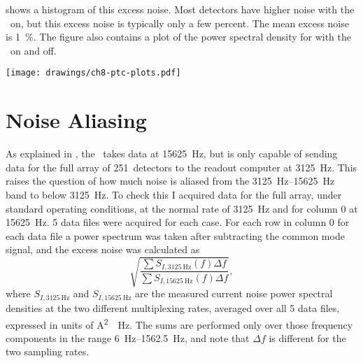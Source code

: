  shows a histogram of this excess noise. Most detectors have higher noise with the \PTC\ on, but this excess noise is typically only a few percent. 
The mean excess noise is \SI{1}{\percent}.
The figure also contains a plot of the power spectral density for  with the \PTC\ on and off.

\begin{figure*}
  \centering
\texttt{[image: drawings/ch8-ptc-plots.pdf]}
\caption{%
\textbf{Top}
Histogram showing excess noise due to \PTC, defined as ratio of total noise above \SI{6}{\Hz} (see text for precise definition).
More detectors have higher noise with \PTC\ on than off, but the mean excess noise is only \SI{1}{\percent}.
\textbf{Bottom}
Current noise for  with \PTC\ on and off, after subtracting common mode noise.
The noise below \SI{30}{\Hz} is 1.5--2.5 times higher with the \PTC\ on, but the total standard deviation of the relevant frequencies of $f >= \SI{6}{\Hz}$ is only \SI{2.9}{\percent}.
}
\label{fig:ch8-ptc-plots}
\end{figure*}

\section{Noise Aliasing}

As explained in , the \MCE\ takes data at \SI{15625}{\hertz}, but is only capable of sending data for the full array of 251~detectors to the readout computer at \SI{3125}{\hertz}.
This raises the question of how much noise is aliased from the \SIrange{3125}{15625}{\hertz} band to below \SI{3125}{\hertz}.
To check this I acquired data for the full array, under standard operating conditions, at the normal rate of \SI{3125}{\hertz} and for column 0 at \SI{15625}{\hertz}.
5 data files were acquired for each case. For each row in column 0 for each data file a power spectrum was taken after subtracting the common mode signal, and the excess noise was calculated as
\begin{equation}
  \sqrt{  \frac{ \sum S_{I,\SI{3125}{\Hz}}(f) \Delta f }
               { \sum S_{I,\SI{15625}{\Hz}}(f) \Delta f }},
\end{equation}
where $S_{I,\SI{3125}{\Hz}}$ and $S_{I,\SI{15625}{\Hz}}$ are the measured current noise power spectral densities at the two different multiplexing rates, averaged over all 5 data files, expressed in units of \si{\A^2 \per \Hz}.
The sums are performed only over those frequency components in the range \SIrange{6}{1562.5}{\Hz}, and note that $\Delta f$ is different for the two sampling rates.

